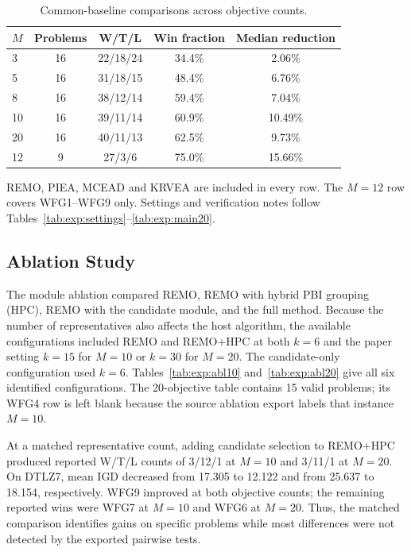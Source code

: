 \begin{table}[t]
\centering
\caption{Common-baseline comparisons across objective counts.}
\label{tab:exp:objectives}
\scriptsize
\setlength{\tabcolsep}{2.5pt}
\renewcommand{\arraystretch}{1.12}
\begin{tabular}{lcccc}
\toprule
$M$ & Problems & W/T/L & Win fraction & Median reduction \\
\midrule
3 & 16 & 22/18/24 & 34.4\% & 2.06\% \\
5 & 16 & 31/18/15 & 48.4\% & 6.76\% \\
8 & 16 & 38/12/14 & 59.4\% & 7.04\% \\
10 & 16 & 39/11/14 & 60.9\% & 10.49\% \\
20 & 16 & 40/11/13 & 62.5\% & 9.73\% \\
\midrule
12 & 9 & 27/3/6 & 75.0\% & 15.66\% \\
\bottomrule
\end{tabular}
\par\smallskip
\begin{minipage}{\linewidth}
\scriptsize REMO, PIEA, MCEAD and KRVEA are included in every row. The $M=12$ row covers WFG1--WFG9 only. Settings and verification notes follow Tables~\ref{tab:exp:settings}--\ref{tab:exp:main20}.
\end{minipage}
\end{table}

\subsection{Ablation Study}
\label{sec:exp:ablation}

The module ablation compared REMO, REMO with hybrid PBI grouping (HPC),
REMO with the candidate module, and the full method. Because the number
of representatives also affects the host algorithm, the available
configurations included REMO and REMO+HPC at both $k=6$ and the paper
setting $k=15$ for $M=10$ or $k=30$ for $M=20$. The candidate-only
configuration used $k=6$. Tables~\ref{tab:exp:abl10}
and~\ref{tab:exp:abl20} give all six identified configurations. The
20-objective table contains 15 valid problems; its WFG4 row is left blank
because the source ablation export labels that instance $M=10$.

At a matched representative count, adding candidate selection to
REMO+HPC produced reported W/T/L counts of 3/12/1 at $M=10$ and 3/11/1
at $M=20$. On DTLZ7, mean IGD decreased from 17.305 to 12.122 and from
25.637 to 18.154, respectively. WFG9 improved at both objective counts;
the remaining reported wins were WFG7 at $M=10$ and WFG6 at $M=20$.
Thus, the matched comparison identifies gains on specific problems while
most differences were not detected by the exported pairwise tests.

